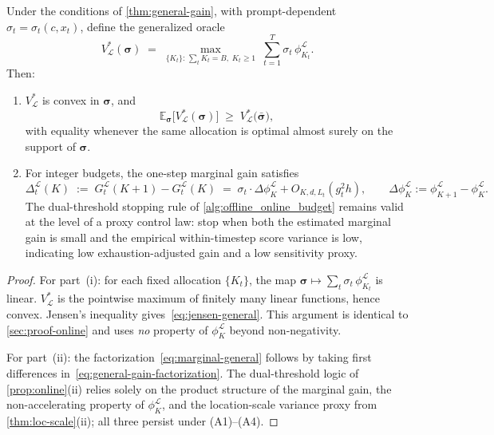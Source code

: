 \begin{corollary}
\label{cor:online-general}
Under the conditions of \cref{thm:general-gain}, with
prompt-dependent $\sigma_t=\sigma_t(c,x_t)$,
define the generalized oracle
\begin{equation}
  V_{\mathcal{L}}^*(\boldsymbol{\sigma})
  \;=\;
  \max_{\{K_t\}:\,\sum_t K_t=B,\;K_t\ge 1}\;
  \sum_{t=1}^{T}\sigma_t\,\phi_{K_t}^{\mathcal{L}}.
  \label{eq:oracle-general}
\end{equation}
Then:
\begin{enumerate}
\item[\textup{(i)}]
  $V_{\mathcal{L}}^*$ is convex in $\boldsymbol{\sigma}$, and
  \begin{equation}
    \mathbb{E}_{\boldsymbol{\sigma}}\!
    \bigl[V_{\mathcal{L}}^*(\boldsymbol{\sigma})\bigr]
    \;\ge\;
    V_{\mathcal{L}}^*\!\bigl(\bar{\boldsymbol{\sigma}}\bigr),
    \label{eq:jensen-general}
  \end{equation}
  with equality whenever the same allocation is optimal almost surely on
  the support of $\boldsymbol{\sigma}$.
\item[\textup{(ii)}]
  For integer budgets, the one-step marginal gain satisfies
  \begin{equation}
    \Delta_t^{\mathcal{L}}(K)
    \;:=\;
    G_t^{\mathcal{L}}(K{+}1)-G_t^{\mathcal{L}}(K)
    \;=\;
    \sigma_t\cdot\Delta\phi_K^{\mathcal{L}}
    + O_{K,d,L_t}(g_t^2 h),
    \qquad
    \Delta\phi_K^{\mathcal{L}}:=\phi_{K+1}^{\mathcal{L}}-\phi_K^{\mathcal{L}}.
    \label{eq:marginal-general}
  \end{equation}
  The dual-threshold stopping rule of \cref{alg:offline_online_budget}
  remains valid at the level of a proxy control law: stop when both the
  estimated marginal gain is small and the empirical within-timestep
  score variance is low, indicating low exhaustion-adjusted gain and a
  low sensitivity proxy.
\end{enumerate}
\end{corollary}

\begin{proof}
For part~(i): for each fixed allocation $\{K_t\}$, the map
$\boldsymbol{\sigma}\mapsto\sum_t\sigma_t\,\phi_{K_t}^{\mathcal{L}}$
is linear.
$V_{\mathcal{L}}^*$ is the pointwise maximum of finitely many
linear functions, hence convex.
Jensen's inequality gives~\eqref{eq:jensen-general}.
This argument is identical to \cref{sec:proof-online} and uses
\emph{no} property of $\phi_K^{\mathcal{L}}$ beyond non-negativity.

For part~(ii): the factorization~\eqref{eq:marginal-general} follows by
taking first differences in~\eqref{eq:general-gain-factorization}.
The dual-threshold logic of \cref{prop:online}(ii) relies solely on
the product structure of the marginal gain, the non-accelerating
property of $\phi_K^{\mathcal{L}}$, and the location-scale variance
proxy from \cref{thm:loc-scale}(ii); all three persist under
(A1)--(A4).
\end{proof}

